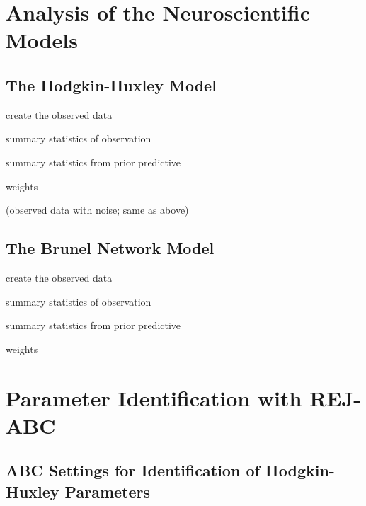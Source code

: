 \chapter{Analysis of the Neuroscientific Models}

\section{The Hodgkin-Huxley Model}

create the observed data

summary statistics of observation 

summary statistics from prior predictive

weights

(observed data with noise; same as above)

\section{The Brunel Network Model}

create the observed data

summary statistics of observation 

summary statistics from prior predictive

weights


\chapter{Parameter Identification with REJ-ABC}

\section{ABC Settings for Identification of Hodgkin-Huxley Parameters}


